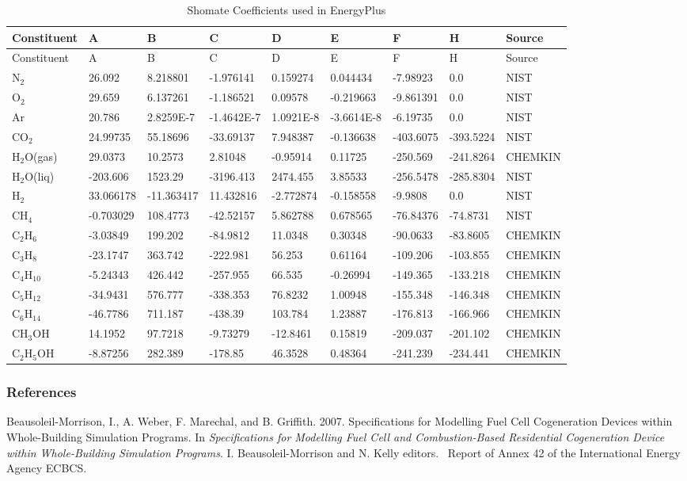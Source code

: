 {\scriptsize
\begin{longtable}[c]{p{0.6in}p{0.6in}p{0.6in}p{0.6in}p{0.6in}p{0.6in}p{0.6in}p{0.6in}p{0.6in}}
\caption{Shomate Coefficients used in EnergyPlus \label{table:shomate-coefficients}} \tabularnewline
\toprule 
Constituent & A & B & C & D & E & F & H & Source \tabularnewline
\midrule
\endfirsthead

\toprule 
Constituent & A & B & C & D & E & F & H & Source \tabularnewline
\midrule
\endhead

N\(_{2}\) & 26.092 & 8.218801 & -1.976141 & 0.159274 & 0.044434 & -7.98923 & 0.0 & NIST \tabularnewline
O\(_{2}\) & 29.659 & 6.137261 & -1.186521 & 0.09578 & -0.219663 & -9.861391 & 0.0 & NIST \tabularnewline
Ar & 20.786 & 2.8259E-7 & -1.4642E-7 & 1.0921E-8 & -3.6614E-8 & -6.19735 & 0.0 & NIST \tabularnewline
CO\(_{2}\) & 24.99735 & 55.18696 & -33.69137 & 7.948387 & -0.136638 & -403.6075 & -393.5224 & NIST \tabularnewline
H\(_{2}\)O(gas) & 29.0373 & 10.2573 & 2.81048 & -0.95914 & 0.11725 & -250.569 & -241.8264 & CHEMKIN \tabularnewline
H\(_{2}\)O(liq) & -203.606 & 1523.29 & -3196.413 & 2474.455 & 3.85533 & -256.5478 & -285.8304 & NIST \tabularnewline
H\(_{2}\) & 33.066178 & -11.363417 & 11.432816 & -2.772874 & -0.158558 & -9.9808 & 0.0 & NIST \tabularnewline
CH\(_{4}\) & -0.703029 & 108.4773 & -42.52157 & 5.862788 & 0.678565 & -76.84376 & -74.8731 & NIST \tabularnewline
C\(_{2}\)H\(_{6}\) & -3.03849 & 199.202 & -84.9812 & 11.0348 & 0.30348 & -90.0633 & -83.8605 & CHEMKIN \tabularnewline
C\(_{3}\)H\(_{8}\) & -23.1747 & 363.742 & -222.981 & 56.253 & 0.61164 & -109.206 & -103.855 & CHEMKIN \tabularnewline
C\(_{4}\)H\(_{10}\) & -5.24343 & 426.442 & -257.955 & 66.535 & -0.26994 & -149.365 & -133.218 & CHEMKIN \tabularnewline
C\(_{5}\)H\(_{12}\) & -34.9431 & 576.777 & -338.353 & 76.8232 & 1.00948 & -155.348 & -146.348 & CHEMKIN \tabularnewline
C\(_{6}\)H\(_{14}\) & -46.7786 & 711.187 & -438.39 & 103.784 & 1.23887 & -176.813 & -166.966 & CHEMKIN \tabularnewline
CH\(_{3}\)OH & 14.1952 & 97.7218 & -9.73279 & -12.8461 & 0.15819 & -209.037 & -201.102 & CHEMKIN \tabularnewline
C\(_{2}\)H\(_{5}\)OH & -8.87256 & 282.389 & -178.85 & 46.3528 & 0.48364 & -241.239 & -234.441 & CHEMKIN \tabularnewline
\bottomrule
\end{longtable}}

\subsubsection{References}\label{references-2-005}

Beausoleil-Morrison, I., A. Weber, F. Marechal, and B. Griffith. 2007. Specifications for Modelling Fuel Cell Cogeneration Devices within Whole-Building Simulation Programs. In \emph{Specifications for Modelling Fuel Cell and Combustion-Based Residential Cogeneration Device within Whole-Building Simulation Programs}. I. Beausoleil-Morrison and N. Kelly editors.~ Report of Annex 42 of the International Energy Agency ECBCS.

